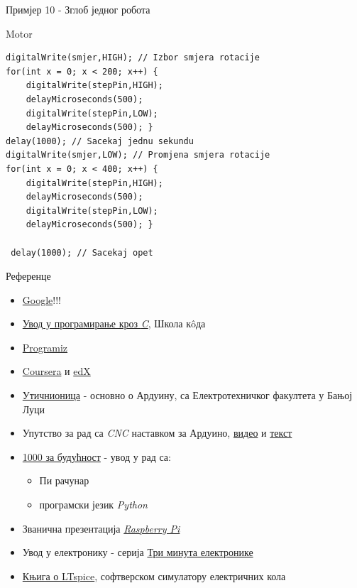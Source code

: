 \documentclass{beamer}
\begin{document}
\begin{frame}[fragile]{Примјер 10 - Зглоб једног робота}
\begin{block}{Motor}
\begin{lstlisting}
digitalWrite(smjer,HIGH); // Izbor smjera rotacije
for(int x = 0; x < 200; x++) {
    digitalWrite(stepPin,HIGH); 
    delayMicroseconds(500); 
    digitalWrite(stepPin,LOW); 
    delayMicroseconds(500); }
delay(1000); // Sacekaj jednu sekundu
digitalWrite(smjer,LOW); // Promjena smjera rotacije
for(int x = 0; x < 400; x++) {
    digitalWrite(stepPin,HIGH);
    delayMicroseconds(500);
    digitalWrite(stepPin,LOW);
    delayMicroseconds(500); }
 
 delay(1000); // Sacekaj opet
\end{lstlisting}
\end{block}
\end{frame}

\begin{frame}{Референце}
\begin{itemize}
    \item \color{orange}\href{https://www.google.com/}{Google}!!!
    \item \color{orange}\href{https://skolakoda.github.io/kursevi/ucimo-c/}{Увод у програмирање кроз \textit{C}}, \color{black} Школа к\^{o}да
    \item \color{orange}\href{https://www.programiz.com/}{Programiz}
    \item \color{orange}\href{https://www.coursera.org/}{Coursera} \color{black}и \color{orange}\href{https://www.edx.org/}{edX}
    \item \color{orange}\href{http://uticnionica.etf.unibl.org/}{Утичнионица}\color{black} - основно о Ардуину, са Електротехничког факултета у Бањој Луци
    \item Упутство за рад са \textit{CNC} наставком за Ардуино, \color{orange}\href{https://www.youtube.com/watch?v=TMK_fLgpESQ}{видео} \color{black}и \color{orange}\href{https://www.electroniclinic.com/arduino-cnc-shield-v3-0-and-a4988-hybrid-stepper-motor-driver-joystick/}{текст}
    \item \color{orange}\href{http://1000zabuducnost.org/}{1000 за будућност}\color{black} - увод у рад са:
    \begin{itemize}
        \item Пи рачунар
        \item програмски језик \textit{Python}
    \end{itemize}
    \item Званична презентација \color{orange}\href{https://www.raspberrypi.org/}{\textit{Raspberry Pi}}\color{black}
    \item Увод у електронику - серија \color{orange}\href{https://www.youtube.com/playlist?list=PLh-StTZA7RZ6Ch6Esin2mnoPzFvLZOYu3}{Три минута електронике}
    \item \href{https://www.nanoluka.org}{Књига о LTspice}\color{black}, софтверском симулатору електричних кола
\end{itemize}
\end{frame}
\end{document}
